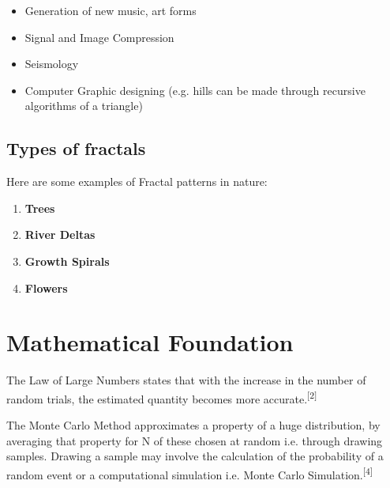 \documentclass{resonance}
\begin{document}
\begin{itemize}
    \item Generation of new music, art forms
    \item Signal and Image Compression
    \item Seismology
    \item Computer Graphic designing (e.g. hills can be made through recursive algorithms of a triangle)
\end{itemize}

\subsection*{Types of fractals}

Here are some examples of Fractal patterns in nature:


\begin{enumerate}
    \item \textbf{Trees}
    \item \textbf{River Deltas}
    \item \textbf{Growth Spirals}
    \item \textbf{Flowers}
\end{enumerate}

\section*{Mathematical Foundation}
The Law of Large Numbers states that with the increase in the number of random trials, the estimated quantity becomes more accurate.\textsuperscript{[2]}

The Monte Carlo Method approximates a property of a huge distribution, by averaging that property for N of these chosen at random i.e. through drawing samples. Drawing a sample may involve the calculation of the probability of a random event or a computational simulation i.e. Monte Carlo Simulation.\textsuperscript{[4]}
\end{document}
